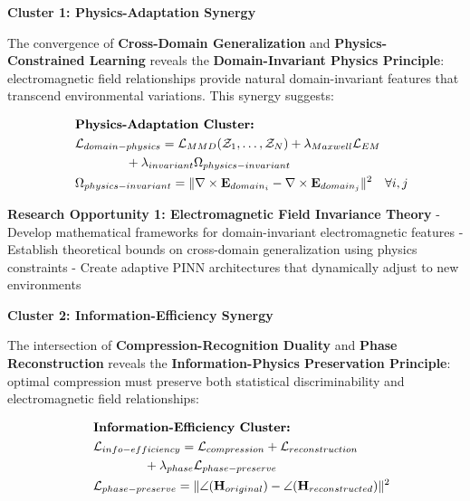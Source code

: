 \documentclass[journal]{IEEEtran}
\begin{document}
\textbf{Cluster 1: Physics-Adaptation Synergy}

The convergence of \textbf{Cross-Domain Generalization} and \textbf{Physics-Constrained Learning} reveals the \textbf{Domain-Invariant Physics Principle}: electromagnetic field relationships provide natural domain-invariant features that transcend environmental variations. This synergy suggests:

\begin{align}
&\hspace{2em} \text{\textbf{Physics-Adaptation Cluster:}} \quad &  \nonumber \\
&\hspace{2em} \mathcal{L}_{domain-physics} = \mathcal{L}_{MMD}(\mathcal{Z}_1, \ldots, \mathcal{Z}_N) + \lambda_{Maxwell} \mathcal{L}_{EM} \quad &  \nonumber \\
&\hspace{6em} + \lambda_{invariant} \Omega_{physics-invariant} \label{eq:domain_physics_cluster} \\
&\hspace{2em} \Omega_{physics-invariant} = \|\nabla \times \mathbf{E}_{domain_i} - \nabla \times \mathbf{E}_{domain_j}\|^2 \quad \forall i,j \label{eq:physics_invariance}
\end{align}

\textbf{Research Opportunity 1: Electromagnetic Field Invariance Theory}
- Develop mathematical frameworks for domain-invariant electromagnetic features
- Establish theoretical bounds on cross-domain generalization using physics constraints
- Create adaptive PINN architectures that dynamically adjust to new environments

\textbf{Cluster 2: Information-Efficiency Synergy}

The intersection of \textbf{Compression-Recognition Duality} and \textbf{Phase Reconstruction} reveals the \textbf{Information-Physics Preservation Principle}: optimal compression must preserve both statistical discriminability and electromagnetic field relationships:

\begin{align}
&\hspace{2em} \text{\textbf{Information-Efficiency Cluster:}} \quad &  \nonumber \\
&\hspace{2em} \mathcal{L}_{info-efficiency} = \mathcal{L}_{compression} + \mathcal{L}_{reconstruction} \quad &  \nonumber \\
&\hspace{6em} + \lambda_{phase} \mathcal{L}_{phase-preserve} \label{eq:info_efficiency_cluster} \\
&\hspace{2em} \mathcal{L}_{phase-preserve} = \|\angle(\mathbf{H}_{original}) - \angle(\mathbf{H}_{reconstructed})\|^2 \label{eq:phase_preservation}
\end{align}
\end{document}
